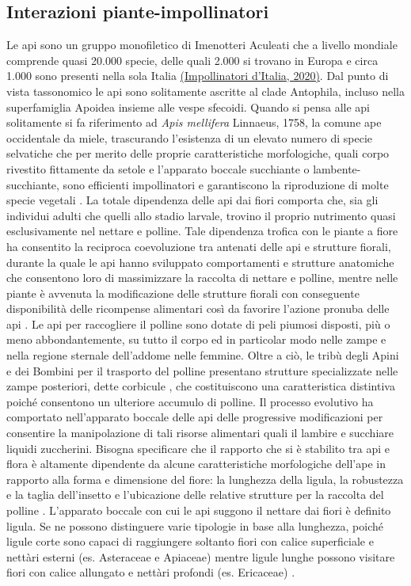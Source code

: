 \documentclass[main.tex]{subfiles}
\begin{document}
\subsection{Interazioni piante-impollinatori}

Le api sono un gruppo monofiletico di Imenotteri Aculeati che a livello mondiale comprende quasi 20.000 specie, delle quali 2.000 si trovano in Europa e circa 1.000 sono presenti nella sola Italia \href{https://www.wwf.it/pandanews/ambiente/impollinatori-ditalia/}{(Impollinatori d’Italia, 2020)}. Dal punto di vista tassonomico le api sono solitamente ascritte al clade Antophila, incluso nella superfamiglia Apoidea insieme alle vespe sfecoidi. Quando si pensa alle api solitamente si fa riferimento ad \textit{Apis mellifera} Linnaeus, 1758, la comune ape occidentale da miele, trascurando l’esistenza di un elevato numero di specie selvatiche che per merito delle proprie caratteristiche morfologiche, quali corpo rivestito fittamente da setole e l’apparato boccale succhiante o lambente-succhiante, sono efficienti impollinatori e garantiscono la riproduzione di molte specie vegetali \citep{dipri}.
La totale dipendenza delle api dai fiori comporta che, sia gli individui adulti che quelli allo stadio larvale, trovino il proprio nutrimento quasi esclusivamente nel nettare e polline. Tale dipendenza trofica con le piante a fiore ha consentito la reciproca coevoluzione tra antenati delle api e strutture fiorali, durante la quale le api hanno sviluppato comportamenti e strutture anatomiche che consentono loro di massimizzare la raccolta di nettare e polline, mentre nelle piante è avvenuta la modificazione delle strutture fiorali con conseguente disponibilità delle ricompense alimentari così da favorire l’azione pronuba delle api \citep{kk}.
Le api per raccogliere il polline sono dotate di peli piumosi disposti, più o meno abbondantemente, su tutto il corpo ed in particolar modo nelle zampe e nella regione sternale dell’addome nelle femmine. Oltre a ciò, le tribù degli Apini e dei Bombini per il trasporto del polline presentano strutture specializzate nelle zampe posteriori, dette corbicule \citep{manipo}, che costituiscono una caratteristica distintiva poiché consentono un ulteriore accumulo di polline. Il processo evolutivo ha comportato nell’apparato boccale delle api delle progressive modificazioni per consentire la manipolazione di tali risorse alimentari quali il lambire e succhiare liquidi zuccherini. Bisogna specificare che il rapporto che si è stabilito tra api e flora è altamente dipendente da alcune caratteristiche morfologiche dell’ape in rapporto alla forma e dimensione del fiore: la lunghezza della ligula, la robustezza e la taglia dell’insetto e l’ubicazione delle relative strutture per la raccolta del polline \citep{borto}. L’apparato boccale con cui le api suggono il nettare dai fiori è definito ligula. Se ne possono distinguere varie tipologie in base alla lunghezza, poiché ligule corte sono capaci di raggiungere soltanto fiori con calice superficiale e nettàri esterni (es. Asteraceae e Apiaceae) mentre ligule lunghe possono visitare fiori con calice allungato e nettàri profondi (es. Ericaceae) \citep{filis}.
\end{document}
